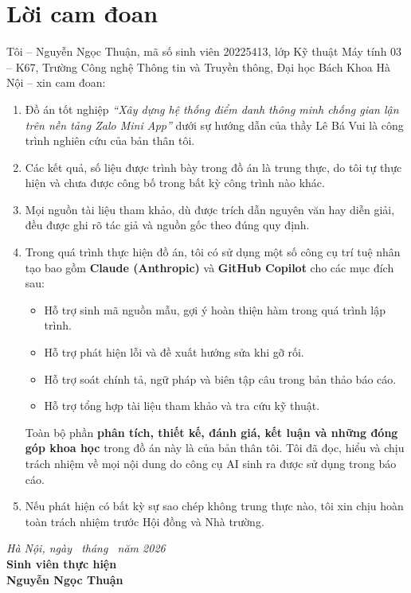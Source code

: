 
\chapter*{Lời cam đoan}
\thispagestyle{plain}

Tôi -- Nguyễn Ngọc Thuận, mã số sinh viên 20225413, lớp Kỹ thuật Máy tính 03 -- K67, Trường Công nghệ Thông tin và Truyền thông, Đại học Bách Khoa Hà Nội -- xin cam đoan:

\begin{enumerate}[leftmargin=1.5em]
  \item Đồ án tốt nghiệp \textit{``Xây dựng hệ thống điểm danh thông minh chống gian lận trên nền tảng Zalo Mini App''} dưới sự hướng dẫn của thầy Lê Bá Vui là công trình nghiên cứu của bản thân tôi.

  \item Các kết quả, số liệu được trình bày trong đồ án là trung thực, do tôi tự thực hiện và chưa được công bố trong bất kỳ công trình nào khác.

  \item Mọi nguồn tài liệu tham khảo, dù được trích dẫn nguyên văn hay diễn giải, đều được ghi rõ tác giả và nguồn gốc theo đúng quy định.

  \item Trong quá trình thực hiện đồ án, tôi có sử dụng một số công cụ trí tuệ nhân tạo bao gồm \textbf{Claude (Anthropic)} và \textbf{GitHub Copilot} cho các mục đích sau:
  \begin{itemize}[leftmargin=1.5em]
    \item Hỗ trợ sinh mã nguồn mẫu, gợi ý hoàn thiện hàm trong quá trình lập trình.
    \item Hỗ trợ phát hiện lỗi và đề xuất hướng sửa khi gỡ rối.
    \item Hỗ trợ soát chính tả, ngữ pháp và biên tập câu trong bản thảo báo cáo.
    \item Hỗ trợ tổng hợp tài liệu tham khảo và tra cứu kỹ thuật.
  \end{itemize}
  Toàn bộ phần \textbf{phân tích, thiết kế, đánh giá, kết luận và những đóng góp khoa học} trong đồ án này là của bản thân tôi. Tôi đã đọc, hiểu và chịu trách nhiệm về mọi nội dung do công cụ AI sinh ra được sử dụng trong báo cáo.

  \item Nếu phát hiện có bất kỳ sự sao chép không trung thực nào, tôi xin chịu hoàn toàn trách nhiệm trước Hội đồng và Nhà trường.
\end{enumerate}

\vspace{2em}
\begin{flushright}
\textit{Hà Nội, ngày \dotfill\ tháng \dotfill\ năm 2026}\\[1em]
\textbf{Sinh viên thực hiện}\\[3em]
\textbf{Nguyễn Ngọc Thuận}
\end{flushright}

\newpage
